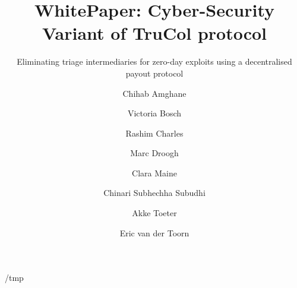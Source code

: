 \documentclass[a4paper, UKenglish, cleveref, autoref, thm-restate]{lipics-v2021}
\title{WhitePaper: Cyber-Security Variant of TruCol protocol} %
\subtitle{Eliminating triage intermediaries for zero-day exploits using a decentralised payout protocol}
\author{Chihab Amghane}{Radboud University}%
{}{}{(Optional) author-specific funding acknowledgements}%
\author{Victoria Bosch}{Radboud University}%
{}{}{}%
\author{Rashim Charles}{Radboud University}%
{}{}{}%
\author{Marc Droogh}{Delft University of Technology}%
{}{}{}%
\author{Clara Maine}{Radboud University}%
{}{}{}%
\author{Chinari Subhechha Subudhi}{Delft University of Technology}%
{}{}{}%
\author{Akke Toeter}{Delft University of Technology, Radboud University}%
{a.h.h.toeter@student.tudelft.nl}{0000-0002-9577-920X}{}%
\author{Eric van der Toorn}{Delft University of Technology}%
{}{}{}%
\def\overleafhome{/tmp}%
\begin{document}
\maketitle

\ifx\homepath\overleafhome
    
    
    
    
    
\else
    
    
    
    
    
\fi
%
 


 
\end{document}
